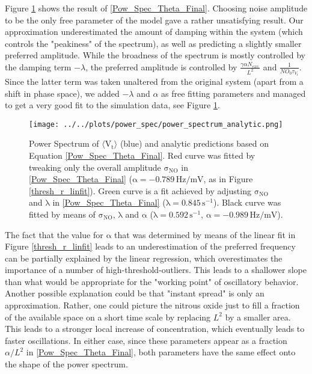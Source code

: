 \documentclass[10pt,a4paper]{article}
\begin{document}
Figure \ref{Pow_Spec_Theta_vs_Analytic} shows the result of \eqref{Pow_Spec_Theta_Final}. Choosing noise amplitude to be the only free parameter of the model gave a rather unsatisfying result. Our approximation underestimated the amount of damping within the system (which controls the "peakiness" of the spectrum), as well as predicting a slightly smaller preferred amplitude. While the broadness of the spectrum is mostly controlled by the damping term $-\lambda$, the preferred amplitude is controlled by $\frac{\gamma \alpha N_{exc.}}{L^2}$ and $\frac{1}{NO_0\tau_{V_t}}$. Since the latter term was taken unaltered from the original system (apart from a shift in phase space), we added $-\lambda$ and $\alpha$ as free fitting parameters and managed to get a very good fit to the simulation data, see Figure \ref{Pow_Spec_Theta_vs_Analytic}.   
\begin{figure}
\begin{center}
\texttt{[image: ../../plots/power\_spec/power\_spectrum\_analytic.png]}
\end{center}
\caption{Power Spectrum of $\mathrm{\langle V_t \rangle}$ (blue) and analytic predictions based on Equation \eqref{Pow_Spec_Theta_Final}. Red curve was fitted by tweaking only the overall amplitude $\mathrm{\sigma_{NO}}$ in \eqref{Pow_Spec_Theta_Final} ($\mathrm{\alpha = -0.789 \,Hz/mV}$, as in Figure \ref{thresh_r_linfit}). Green curve is a fit achieved by adjusting $\mathrm{\sigma_{NO}}$ and $\mathrm{\lambda}$ in \eqref{Pow_Spec_Theta_Final} ($\mathrm{\lambda = 0.845 \,s^{-1}}$). Black curve was fitted by means of $\mathrm{\sigma_{NO}}$, $\mathrm{\lambda}$ and $\mathrm{\alpha}$ ($\mathrm{\lambda = 0.592 \,s^{-1}}$, $\mathrm{\alpha=-0.989 \,Hz/mV}$).}
\label{Pow_Spec_Theta_vs_Analytic}
\end{figure}
The fact that the value for $\mathrm{\alpha}$ that was determined by means of the linear fit in Figure \ref{thresh_r_linfit} leads to an underestimation of the preferred frequency can be partially explained by the linear regression, which overestimates the importance of a number of high-threshold-outliers. This leads to a shallower slope than what would be appropriate for the "working point" of oscillatory behavior. Another possible explanation could be that "instant spread" is only an approximation. Rather, one could picture the nitrous oxide just to fill a fraction of the available space on a short time scale by replacing $L^2$ by a smaller area. This leads to a stronger local increase of concentration, which eventually leads to faster oscillations. In either case, since these parameters appear as a fraction $\alpha/L^2$ in \eqref{Pow_Spec_Theta_Final}, both parameters have the same effect onto the shape of the power spectrum. 
\end{document}
